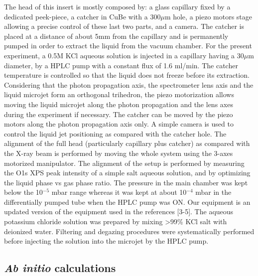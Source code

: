 {The head of this insert is mostly composed by: a glass capillary fixed by a dedicated peek-piece, a catcher in CuBe with a 300$\mu$m hole, a piezo motors stage allowing a precise control of these last two parts, and a camera. The catcher is placed at a distance of about 5mm from the capillary and is permanently pumped in order to extract the liquid from the vacuum chamber. For the present experiment, a 0.5M KCl aqueous solution is injected in a capillary having a 30$\mu$m diameter, by a HPLC pump with a constant flux of 1.6 ml/min. The catcher temperature is controlled so that the liquid does not freeze before its extraction. Considering that the photon propagation axis, the spectrometer lens axis and the liquid microjet form an orthogonal trihedron, the piezo motorization allows moving the liquid microjet along the photon propagation and the lens axes during the experiment if necessary. The catcher can be moved by the piezo motors along the photon propagation axis only. A simple camera is used to control the liquid jet positioning as compared with the catcher hole. The alignment of the full head (particularly capillary plus catcher) as compared with the X-ray beam is performed by moving the whole system using the 3-axes motorized manipulator. The alignment of the setup is performed by measuring the O1s XPS peak intensity of a simple salt aqueous solution, and by optimizing the liquid phase vs gas phase ratio. The pressure in the main chamber was kept below the 10$^{-5}$ mbar range whereas it was kept at about 10$^{-4}$ mbar in the differentially pumped tube when the HPLC pump was ON. Our equipment is an updated version of the equipment used in the references [3-5]. The aqueous potassium chloride solution was prepared by mixing >99\% KCl salt with deionized water. Filtering and degazing procedures were systematically performed before injecting the solution into the microjet by the HPLC pump.
}

\subsection{{\bf{\it Ab initio}} calculations}

